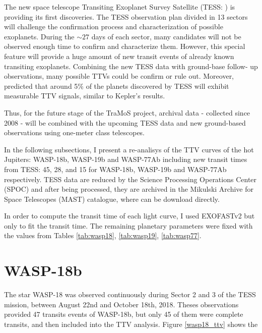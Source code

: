 The new space telescope Transiting Exoplanet Survey Satellite (TESS: \cite{Ricker2014}) is providing its first discoveries. The TESS observation plan divided in 13 sectors will challenge the confirmation process and characterization of possible exoplanets. During the $\sim27$ days of each sector, many candidates will not be observed enough time to confirm and characterize them. However, this special feature will provide a huge amount of new transit events of already known transiting exoplanets. Combining the new TESS data with ground-base follow- up observations, many possible TTVs could be confirm or rule out. Moreover, \cite{Ballard2018} predicted that around 5\% of the planets discovered by TESS will exhibit measurable TTV signals, similar to Kepler’s results.

Thus, for the future stage of the TraMoS project, archival data - collected since 2008 - will be combined with the upcoming TESS data and new ground-based observations using one-meter class telescopes. 

In the following subsections, I present a re-analisys of the TTV curves of the hot Jupiters: WASP-18b, WASP-19b and WASP-77Ab including new transit times from TESS: 45, 28, and 15 for WASP-18b, WASP-19b and WASP-77Ab respectively. TESS data are reduced by the Science Processing Operations Center (SPOC) and after being processed, they are archived in the Mikulski Archive for Space Telescopes (MAST) catalogue, where can be download directly. 

In order to compute the transit time of each light curve, I used EXOFASTv2 but only to fit the transit time. The remaining planetary parameters were fixed with the values from Tables \ref{tab:wasp18}, \ref{tab:wasp19}, \ref{tab:wasp77}.

\section{WASP-18b}

The star WASP-18 was observed continuously during Sector 2 and 3 of the TESS mission, between August 22nd and October 18th, 2018. Theses observations provided 47 transits events of WASP-18b, but only 45 of them were complete transits, and then included into the TTV analysis. Figure \ref{wasp18_ttv} shows the


